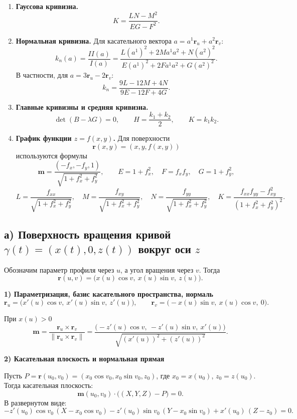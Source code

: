 \documentclass[12pt,a4paper]{article}
\begin{document}
\begin{enumerate}
    \item \textbf{Гауссова кривизна.}
    \[
    K = \frac{LN-M^2}{EG-F^2}.
    \]

    \item \textbf{Нормальная кривизна.}
    Для касательного вектора $a=a^1\mathbf r_u+a^2\mathbf r_v$:
    \[
    k_n(a)=\frac{II(a)}{I(a)}
    =\frac{L(a^1)^2+2Ma^1a^2+N(a^2)^2}{E(a^1)^2+2Fa^1a^2+G(a^2)^2}.
    \]
    В частности, для $a=3\mathbf r_u-2\mathbf r_v$:
    \[
    k_n=\frac{9L-12M+4N}{9E-12F+4G}.
    \]

    \item \textbf{Главные кривизны и средняя кривизна.}
    \[
    \det(B-\lambda G)=0, \qquad H=\frac{k_1+k_2}{2}, \qquad K=k_1k_2.
    \]

    \item \textbf{График функции $z=f(x,y)$.}
    Для поверхности
    \[
    \mathbf r(x,y)=(x,y,f(x,y))
    \]
    используются формулы
    \[
    \mathbf m=\frac{(-f_x,-f_y,1)}{\sqrt{1+f_x^2+f_y^2}},\qquad
    E=1+f_x^2,\quad F=f_xf_y,\quad G=1+f_y^2,
    \]
    \[
    L=\frac{f_{xx}}{\sqrt{1+f_x^2+f_y^2}},\quad
    M=\frac{f_{xy}}{\sqrt{1+f_x^2+f_y^2}},\quad
    N=\frac{f_{yy}}{\sqrt{1+f_x^2+f_y^2}},\quad
    K=\frac{f_{xx}f_{yy}-f_{xy}^2}{(1+f_x^2+f_y^2)^2}.
    \]
\end{enumerate}

\subsection*{а) Поверхность вращения кривой $\gamma(t) = (x(t), 0, z(t))$ вокруг оси $z$}

Обозначим параметр профиля через $u$, а угол вращения через $v$. Тогда
\[
\mathbf r(u,v) = \bigl(x(u)\cos v,\ x(u)\sin v,\ z(u)\bigr).
\]

\textbf{1) Параметризация, базис касательного пространства, нормаль}
\[
\mathbf r_u = \bigl(x'(u)\cos v,\ x'(u)\sin v,\ z'(u)\bigr), \qquad
\mathbf r_v = \bigl(-x(u)\sin v,\ x(u)\cos v,\ 0\bigr).
\]

При $x(u)>0$
\[
\mathbf m = \frac{\mathbf r_u \times \mathbf r_v}{\|\mathbf r_u \times \mathbf r_v\|}
= \frac{\bigl(-z'(u)\cos v,\ -z'(u)\sin v,\ x'(u)\bigr)}{\sqrt{(x'(u))^2 + (z'(u))^2}}.
\]

\textbf{2) Касательная плоскость и нормальная прямая}

Пусть $P=\mathbf r(u_0,v_0)=(x_0\cos v_0,x_0\sin v_0,z_0)$, где $x_0=x(u_0)$, $z_0=z(u_0)$.
Тогда касательная плоскость:
\[
\mathbf m(u_0,v_0)\cdot \bigl((X,Y,Z)-P\bigr)=0.
\]
В развернутом виде:
\[
-z'(u_0)\cos v_0\,(X-x_0\cos v_0) - z'(u_0)\sin v_0\,(Y-x_0\sin v_0)
+ x'(u_0)\,(Z-z_0)=0.
\]
\end{document}
